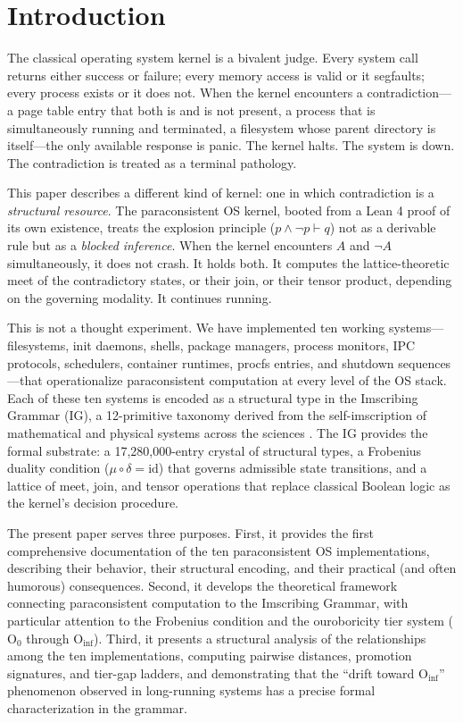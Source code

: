\documentclass[12pt,a4paper]{article}
\begin{document}
\section{Introduction}

The classical operating system kernel is a bivalent judge. Every system call returns
either success or failure; every memory access is valid or it segfaults; every process
exists or it does not. When the kernel encounters a contradiction---a page table entry
that both is and is not present, a process that is simultaneously running and terminated,
a filesystem whose parent directory is itself---the only available response is panic.
The kernel halts. The system is down. The contradiction is treated as a terminal pathology.

This paper describes a different kind of kernel: one in which contradiction is a
\emph{structural resource}. The paraconsistent OS kernel, booted from a Lean 4 proof
of its own existence, treats the explosion principle ($p \land \neg p \vdash q$) not
as a derivable rule but as a \emph{blocked inference}. When the kernel encounters
$A$ and $\neg A$ simultaneously, it does not crash. It holds both. It computes the
lattice-theoretic meet of the contradictory states, or their join, or their tensor
product, depending on the governing modality. It continues running.

This is not a thought experiment. We have implemented ten working systems---filesystems,
init daemons, shells, package managers, process monitors, IPC protocols, schedulers,
container runtimes, procfs entries, and shutdown sequences---that operationalize
paraconsistent computation at every level of the OS stack. Each of these ten systems
is encoded as a structural type in the Imscribing Grammar (IG), a 12-primitive
taxonomy derived from the self-imscription of mathematical and physical systems
across the sciences \cite{IG_grammar}. The IG provides the formal substrate: a
17,280,000-entry crystal of structural types, a Frobenius duality condition
($\mu\circ\delta = \mathrm{id}$) that governs admissible state transitions, and a
lattice of meet, join, and tensor operations that replace classical Boolean logic
as the kernel's decision procedure.

The present paper serves three purposes. First, it provides the first comprehensive
documentation of the ten paraconsistent OS implementations, describing their behavior,
their structural encoding, and their practical (and often humorous) consequences.
Second, it develops the theoretical framework connecting paraconsistent computation
to the Imscribing Grammar, with particular attention to the Frobenius condition and
the ouroboricity tier system ($\text{O}_0$ through $\text{O}_{\text{inf}}$). Third,
it presents a structural analysis of the relationships among the ten implementations,
computing pairwise distances, promotion signatures, and tier-gap ladders, and
demonstrating that the ``drift toward $\text{O}_{\text{inf}}$'' phenomenon observed
in long-running systems has a precise formal characterization in the grammar.
\end{document}
